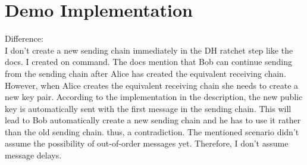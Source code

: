 \chapter{Demo Implementation}
\label{ch:implementation}

Difference:\\
I don't create a new sending chain immediately in the DH ratchet step like the docs. I created on command. The docs mention that Bob can continue sending from the sending chain after Alice has created the equivalent receiving chain. However, when Alice creates the equivalent receiving chain she needs to create a new key pair. According to the implementation in the description, the new public key is automatically sent with the first message in the sending chain. This will lead to Bob automatically create a new sending chain and he has to use it rather than the old sending chain. thus, a contradiction. The mentioned scenario didn't assume the possibility of out-of-order messages yet. Therefore, I don't assume message delays.
